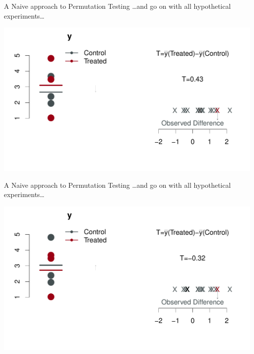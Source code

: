 \begin{frame}{A Naive approach to Permutation Testing}
 \ldots and go on with all hypothetical experiments\ldots 
\begin{center}
\includegraphics[width=1.1\textwidth]{figures/permsslides14} 
\end{center}
\end{frame}


\begin{frame}{A Naive approach to Permutation Testing}
 \ldots and go on with all hypothetical experiments\ldots 
\begin{center}
\includegraphics[width=1.1\textwidth]{figures/permsslides15} 
\end{center}
\end{frame}


